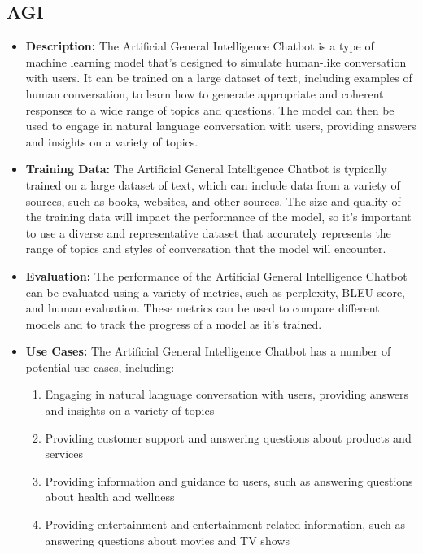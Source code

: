\begin{itemize}
\subsection{AGI}

\begin{itemize}
    \item \textbf{Description:} The Artificial General Intelligence Chatbot is a type of machine learning model that's designed to simulate human-like conversation with users. It can be trained on a large dataset of text, including examples of human conversation, to learn how to generate appropriate and coherent responses to a wide range of topics and questions. The model can then be used to engage in natural language conversation with users, providing answers and insights on a variety of topics.
    \item \textbf{Training Data:} The Artificial General Intelligence Chatbot is typically trained on a large dataset of text, which can include data from a variety of sources, such as books, websites, and other sources. The size and quality of the training data will impact the performance of the model, so it's important to use a diverse and representative dataset that accurately represents the range of topics and styles of conversation that the model will encounter.
    \item \textbf{Evaluation:} The performance of the Artificial General Intelligence Chatbot can be evaluated using a variety of metrics, such as perplexity, BLEU score, and human evaluation. These metrics can be used to compare different models and to track the progress of a model as it's trained.
    \item \textbf{Use Cases:} The Artificial General Intelligence Chatbot has a number of potential use cases, including:
        \begin{enumerate}  
            \item Engaging in natural language conversation with users, providing answers and insights on a variety of topics
            \item Providing customer support and answering questions about products and services
            \item Providing information and guidance to users, such as answering questions about health and wellness
            \item Providing entertainment and entertainment-related information, such as answering questions about movies and TV shows
        \end{enumerate}
\begin{marginfigure}[-5.5cm]

\end{marginfigure}
\end{itemize}
\end{itemize}
